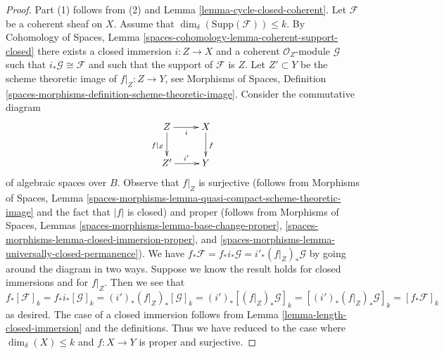 \documentclass{stacks-project}
\theoremstyle{plain}
\theoremstyle{definition}
\theoremstyle{remark}
\numberwithin{equation}{subsection}
\begin{document}
\begin{proof}
Part (1) follows from (2) and Lemma \ref{lemma-cycle-closed-coherent}.
Let $\mathcal{F}$ be a coherent sheaf on $X$.
Assume that $\dim_\delta(\text{Supp}(\mathcal{F})) \leq k$.
By Cohomology of Spaces, Lemma
\ref{spaces-cohomology-lemma-coherent-support-closed}
there exists a closed immersion $i : Z \to X$ and a coherent
$\mathcal{O}_Z$-module $\mathcal{G}$ such that
$i_*\mathcal{G} \cong \mathcal{F}$ and such that the support
of $\mathcal{F}$ is $Z$. Let $Z' \subset Y$ be the scheme theoretic image
of $f|_Z : Z \to Y$, see Morphisms of Spaces, Definition
\ref{spaces-morphisms-definition-scheme-theoretic-image}.
Consider the commutative diagram
$$
\xymatrix{
Z \ar[r]_i \ar[d]_{f|_Z} &
X \ar[d]^f \\
Z' \ar[r]^{i'} & Y
}
$$
of algebraic spaces over $B$. Observe that $f|_Z$ is surjective
(follows from Morphisms of Spaces, Lemma
\ref{spaces-morphisms-lemma-quasi-compact-scheme-theoretic-image}
and the fact that $|f|$ is closed) and proper
(follows from Morphisms of Spaces, Lemmas
\ref{spaces-morphisms-lemma-base-change-proper},
\ref{spaces-morphisms-lemma-closed-immersion-proper}, and
\ref{spaces-morphisms-lemma-universally-closed-permanence}).
We have $f_*\mathcal{F} = f_*i_*\mathcal{G} = i'_*(f|_Z)_*\mathcal{G}$
by going around the diagram in two ways. Suppose we know the result holds
for closed immersions and for $f|_Z$. Then we see that
$$
f_*[\mathcal{F}]_k = f_*i_*[\mathcal{G}]_k
= (i')_*(f|_Z)_*[\mathcal{G}]_k =
(i')_*[(f|_Z)_*\mathcal{G}]_k =
[(i')_*(f|_Z)_*\mathcal{G}]_k = [f_*\mathcal{F}]_k
$$
as desired. The case of a closed immersion follows from
Lemma \ref{lemma-length-closed-immersion} and the definitions.
Thus we have reduced to the case where
$\dim_\delta(X) \leq k$ and $f : X \to Y$ is proper and surjective.


\end{proof}
\end{document}
